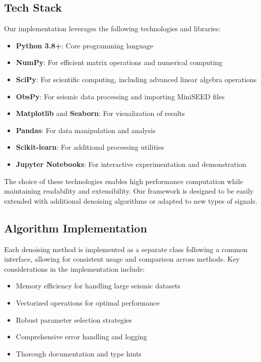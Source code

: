 \documentclass[11pt]{article}
\begin{document}
\subsection{Tech Stack}
Our implementation leverages the following technologies and libraries:

\begin{itemize}
\item \textbf{Python 3.8+}: Core programming language
\item \textbf{NumPy}: For efficient matrix operations and numerical computing
\item \textbf{SciPy}: For scientific computing, including advanced linear algebra operations
\item \textbf{ObsPy}: For seismic data processing and importing MiniSEED files
\item \textbf{Matplotlib} and \textbf{Seaborn}: For visualization of results
\item \textbf{Pandas}: For data manipulation and analysis
\item \textbf{Scikit-learn}: For additional processing utilities
\item \textbf{Jupyter Notebooks}: For interactive experimentation and demonstration
\end{itemize}

The choice of these technologies enables high performance computation while maintaining readability and extensibility. Our framework is designed to be easily extended with additional denoising algorithms or adapted to new types of signals.

\subsection{Algorithm Implementation}
Each denoising method is implemented as a separate class following a common interface, allowing for consistent usage and comparison across methods. Key considerations in the implementation include:

\begin{itemize}
\item Memory efficiency for handling large seismic datasets
\item Vectorized operations for optimal performance
\item Robust parameter selection strategies
\item Comprehensive error handling and logging
\item Thorough documentation and type hints
\end{itemize}
\end{document}

